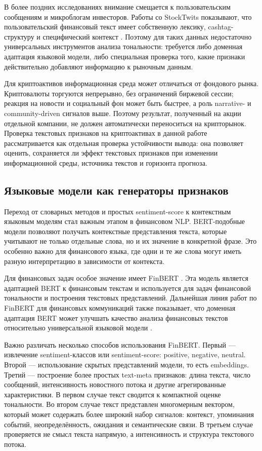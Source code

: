В более поздних исследованиях внимание смещается к пользовательским сообщениям и микроблогам инвесторов. Работы со StockTwits показывают, что пользовательский финансовый текст имеет собственную лексику, cashtag-структуру и специфический контекст \cite{jaggi2021stocktwits}. Поэтому для таких данных недостаточно универсальных инструментов анализа тональности: требуется либо доменная адаптация языковой модели, либо специальная проверка того, какие признаки действительно добавляют информацию к рыночным данным.

Для криптоактивов информационная среда может отличаться от фондового рынка. Криптовалюты торгуются непрерывно, без ограничений биржевой сессии; реакция на новости и социальный фон может быть быстрее, а роль narrative- и community-driven сигналов выше. Поэтому результат, полученный на акции отдельной компании, не должен автоматически переноситься на крипторынок. Проверка текстовых признаков на криптоактивах в данной работе рассматривается как отдельная проверка устойчивости вывода: она позволяет оценить, сохраняется ли эффект текстовых признаков при изменении информационной среды, источника текстов и горизонта прогноза.

\subsection{Языковые модели как генераторы признаков}

Переход от словарных методов и простых sentiment-score к контекстным языковым моделям стал важным этапом в финансовом NLP. BERT-подобные модели позволяют получать контекстные представления текста, которые учитывают не только отдельные слова, но и их значение в конкретной фразе. Это особенно важно для финансового языка, где одни и те же слова могут иметь разную интерпретацию в зависимости от контекста.

Для финансовых задач особое значение имеет FinBERT \cite{araci2019finbert}. Эта модель является адаптацией BERT к финансовым текстам и используется для задач финансовой тональности и построения текстовых представлений. Дальнейшая линия работ по FinBERT для финансовых коммуникаций также показывает, что доменная адаптация BERT может улучшать качество анализа финансовых текстов относительно универсальной языковой модели \cite{yang2020finbert}.

Важно различать несколько способов использования FinBERT. Первый --- извлечение sentiment-классов или sentiment-score: positive, negative, neutral. Второй --- использование скрытых представлений модели, то есть embeddings. Третий --- построение более простых text-meta признаков: длина текста, число сообщений, интенсивность новостного потока и другие агрегированные характеристики. В первом случае текст сводится к компактной оценке тональности. Во втором случае текст представлен многомерным вектором, который может содержать более широкий набор сигналов: контекст, упоминания событий, неопределённость, ожидания и семантические связи. В третьем случае проверяется не смысл текста напрямую, а интенсивность и структура текстового потока.


